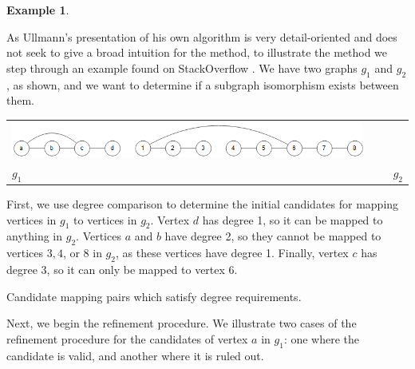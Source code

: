 \documentclass[12pt]{thesis}
\theoremstyle{plain}
\theoremstyle{definition}
\newtheorem{example}[theorem]{Example}
\theoremstyle{remark}
\begin{document}
\begin{example}\label{ex:ullmann}

As Ullmann's presentation of his own algorithm is very detail-oriented and does not seek to give a broad intuition for the method, to illustrate the method we step through an example found on StackOverflow \cite{ullmannStackOverflow}. We have two graphs $g_1$ and $g_2$, as shown, and we want to determine if a subgraph isomorphism exists between them.


\vspace{-30pt}
\begin{center}
\begin{tabular}{C{0.35\textwidth}C{0.6\textwidth}}
\includegraphics[width=0.95\textwidth]{ullmann_demo_cropped.png} & \\ $g_1$ & $g_2$\\
\end{tabular}
\end{center}

First, we use degree comparison to determine the initial candidates for mapping vertices in $g_1$ to vertices in $g_2$. Vertex $d$ has degree 1, so it can be mapped to anything in $g_2$. Vertices $a$ and $b$ have degree 2, so they cannot be mapped to vertices $3, 4$, or $8$ in $g_2$, as these vertices have degree 1. Finally, vertex $c$ has degree 3, so it can only be mapped to vertex 6.

\begin{center}
\footnotesize\singlespacing Candidate mapping pairs which satisfy degree requirements.
\end{center}
\vspace{-5pt}

Next, we begin the refinement procedure. We illustrate two cases of the refinement procedure for the candidates of vertex $a$ in $g_1$: one where the candidate is valid, and another where it is ruled out.


\end{example}
\end{document}
